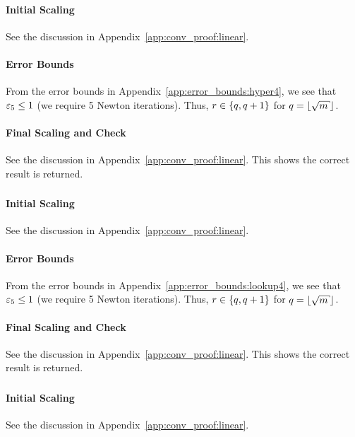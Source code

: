 \paragraph{Initial Scaling}
See the discussion in Appendix~\ref{app:conv_proof:linear}.

\paragraph{Error Bounds}
From the error bounds in Appendix~\ref{app:error_bounds:hyper4},
we see that $\varepsilon_{5}\le1$ (we require 5 Newton iterations).
Thus, $r\in\left\{ q,q+1 \right\}$ for $q = \floor{\sqrt{m}}$.

\paragraph{Final Scaling and Check}
See the discussion in Appendix~\ref{app:conv_proof:linear}.
This shows the correct result is returned.

\subsubsection{\LookupFour{}}
\label{app:conv_proof:lookup4}

\paragraph{Initial Scaling}
See the discussion in Appendix~\ref{app:conv_proof:linear}.

\paragraph{Error Bounds}
From the error bounds in Appendix~\ref{app:error_bounds:lookup4},
we see that $\varepsilon_{5}\le1$ (we require 5 Newton iterations).
Thus, $r\in\left\{ q,q+1 \right\}$ for $q = \floor{\sqrt{m}}$.

\paragraph{Final Scaling and Check}
See the discussion in Appendix~\ref{app:conv_proof:linear}.
This shows the correct result is returned.

\subsubsection{\LookupEight{}}

\paragraph{Initial Scaling}
See the discussion in Appendix~\ref{app:conv_proof:linear}.

